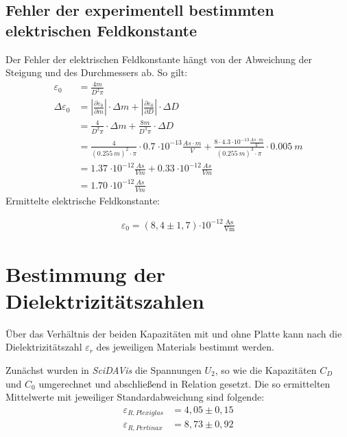 \subsection{Fehler der experimentell bestimmten elektrischen Feldkonstante}
Der Fehler der elektrischen Feldkonstante hängt von der Abweichung der Steigung und des Durchmessers ab. So gilt:
\begin{align}
    \varepsilon_{0} &= \frac{4 m}{D^{2} \pi} \nonumber \\
    \Delta\varepsilon_{0} &= \left\vert\frac{\partial\varepsilon_{0}}{\partial m}\right\vert \cdot \Delta m + \left\vert\frac{\partial\varepsilon_{0}}{\partial D}\right\vert \cdot \Delta D \nonumber \\
    &= \frac{4}{D^2 \pi} \cdot \Delta m + \frac{8 m}{D^3 \pi} \cdot \Delta D \nonumber \\
    &= \frac{4}{(\SI{0,255}{m})^{2} \cdot \pi} \cdot \SI{0,7}{\cdot 10^{-13}\frac{As\cdot m}{V}} + \frac{8 \cdot \SI{4,3}{\cdot 10^{-13}\frac{As \cdot m}{V}}}{(\SI{0,255}{m})^{3} \cdot \pi} \cdot \SI{0,005}{m} \nonumber \\
    &= \SI{1,37}{\cdot 10^{-12}\frac{As}{Vm}} + \SI{0,33}{\cdot 10^{-12}\frac{As}{Vm}} \nonumber \\
    &= \SI{1,70}{\cdot 10^{-12}\frac{As}{Vm}}
\end{align}
Ermittelte elektrische Feldkonstante:\par
\begin{align}
    \varepsilon_{0}=(8,4\pm 1,7){\cdot 10^{-12}\frac{\text{As}}{\text{Vm}}}
\end{align}
%
%
%
\section{Bestimmung der Dielektrizitätszahlen}
Über das Verhältnis der beiden Kapazitäten mit und ohne Platte kann nach  die Dielektrizitätszahl
$\varepsilon_{r}$ des jeweiligen Materials bestimmt werden.\par
Zunächst wurden in \textit{SciDAVis} die Spannungen $ U_{2} $, so wie die Kapazitäten $ C_{D} $ und $ C_{0} $ umgerechnet
und abschließend in Relation gesetzt. Die so ermittelten Mittelwerte mit jeweiliger Standardabweichung sind folgende:
\begin{align}
    \varepsilon_{R,Plexiglas} &= 4,05\pm 0,15\\
    \varepsilon_{R,Pertinax} &= 8,73\pm 0,92
\end{align}